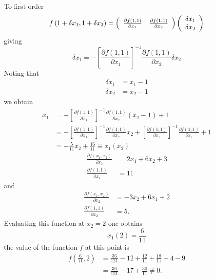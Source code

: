 \documentclass[aps,preprint]{revtex4}%
\begin{document}
To first order
\begin{equation}
f\left(  1+\delta x_{1},1+\delta x_{2}\right)  =\left(
\begin{array}
[c]{cc}%
\frac{\partial f\left(  1,1\right)  }{\partial x_{1}} & \frac{\partial
f\left(  1,1\right)  }{\partial x_{2}}%
\end{array}
\right)  \left(
\begin{array}
[c]{c}%
\delta x_{1}\\
\delta x_{2}%
\end{array}
\right)
\end{equation}
giving
\begin{equation}
\delta x_{1}=-\left[  \frac{\partial f\left(  1,1\right)  }{\partial x_{1}%
}\right]  ^{-1}\frac{\partial f\left(  1,1\right)  }{\partial x_{2}}\delta
x_{2}%
\end{equation}
Noting that
\begin{align}
\delta x_{1} &  =x_{1}-1\\
\delta x_{2} &  =x_{2}-1
\end{align}
we obtain
\begin{align}
x_{1} &  =-\left[  \frac{\partial f\left(  1,1\right)  }{\partial x_{1}%
}\right]  ^{-1}\frac{\partial f\left(  1,1\right)  }{\partial x_{2}}\left(
x_{2}-1\right)  +1\\
&  =-\left[  \frac{\partial f\left(  1,1\right)  }{\partial x_{1}}\right]
^{-1}\frac{\partial f\left(  1,1\right)  }{\partial x_{2}}x_{2}+\left[
\frac{\partial f\left(  1,1\right)  }{\partial x_{1}}\right]  ^{-1}%
\frac{\partial f\left(  1,1\right)  }{\partial x_{2}}+1\\
&  =-\frac{5}{11}x_{2}+\frac{16}{11}\equiv x_{1}\left(  x_{2}\right)
\end{align}%
\begin{align}
\frac{\partial f\left(  x_{1},x_{2}\right)  }{\partial x_{1}} &
=2x_{1}+6x_{2}+3\\
\frac{\partial f\left(  1,1\right)  }{\partial x_{1}} &  =11
\end{align}
and
\begin{align}
\frac{\partial f\left(  x_{1},x_{2}\right)  }{\partial x_{2}} &
=-3x_{2}+6x_{1}+2\\
\frac{\partial f\left(  1,1\right)  }{\partial x_{2}} &  =5.
\end{align}
Evaluating this function at $x_{2}=2$ one obtains
\begin{equation}
x_{1}\left(  2\right)  =\frac{6}{11}%
\end{equation}
the value of the function $f$ at this point is
\begin{align}
f\left(  \frac{6}{11},2\right)   &  =\frac{36}{121}-12+\frac{12}{11}+\frac
{18}{11}+4-9\\
&  =\frac{36}{121}-17+\frac{30}{11}\neq0.
\end{align}
%
\end{document}
